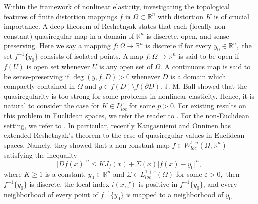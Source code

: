 \documentclass[11pt,twoside]{article}
\theoremstyle{definition}
\theoremstyle{remark}
\begin{document}
Within the framework of nonlinear elasticity, investigating the topological features of finite distortion mappings $f$ in $\Omega\subset\mathbb{R}^{n}$ with distortion $K$ is of crucial importance. A  deep theorem of Reshetnyak \cite{Res67} states that each (locally non-constant) quasiregular map in a domain of $\mathbb{R}^{n}$ is discrete, open, and sense-preserving. Here we say a mapping $f:\Omega\rightarrow\mathbb{R}^{n}$ is discrete if for every $y_{0}\in\mathbb{R}^{n},$ the set $f^{-1}\{y_{0}\}$ consists of isolated points. A map $f:\Omega\rightarrow\mathbb{R}^{n}$  is said to be open if $f(U)$ is open set whenever $U$ is any open set of $\Omega.$ A continuous map is said to be sense-preserving if ${\deg}(y,f,D)>0$ whenever $D$ is a domain which compactly contained in $\Omega$ and $y\in f(D)\setminus f(\partial D).$ J. M. Ball \cite{Bal77,Bal81} showed that the quasiregularity is too strong for some problems in nonlinear elasticity. Hence, it is natural to consider the case for $K\in L_{loc}^{p}$ for some $p>0.$ For existing results on this problem in Euclidean spaces, we refer the reader to  \cite{Bal81,IS93,HK93,VM98,Bjö,HM02,HR13,KOZ26}. For the non-Euclidean setting, we refer to \cite{HH97,Zap08,Kir16,BV23,MR25,Zho251}. 
In particular, recently Kangasniemi and Onninen  \cite{KO222} has extended Reshetnyak's theorem to the case of quasiregular values in Euclidean spaces. Namely, they showed that a non-constant map $f\in W_{loc}^{1,n}(\Omega,\mathbb{R}^{n})$ satisfying the inequality
$$\vert Df(x)\vert^{n}\leq KJ_{f}(x)+\Sigma(x)\vert f(x)-y_{0}\vert^{n},$$
where $K\geq1$ is a constant, $y_{0}\in \mathbb{R}^{n}$ and $\Sigma\in L_{loc}^{1+\varepsilon}(\Omega)$ for some $\varepsilon>0,$ then $f^{-1}\{y_{0}\}$ is discrete, the local index $i(x,f)$ is positive in $f^{-1}\{y_{0}\}$, and every neighborhood of every point of $f^{-1}\{y_{0}\}$ is mapped to a neighborhood of $y_{0}.$ 
\end{document}
